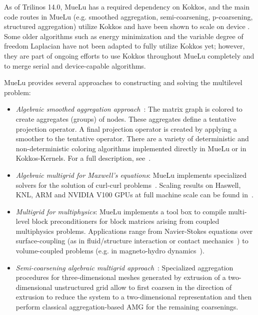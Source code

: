 As of Trilinos 14.0, MueLu has a required dependency on Kokkos,
and the main code routes in MueLu (e.g. smoothed aggregation, semi-coarsening, p-coarsening, structured aggregation)
utilize Kokkos and have been shown to scale on device .
Some older algorithms such as energy minimization and the variable degree of freedom Laplacian have not been adapted to fully utilize Kokkos yet;
however, they are part of ongoing efforts to use Kokkos throughout MueLu completely and to merge serial and device-capable algorithms.

MueLu provides several approaches to constructing and solving the multilevel problem:

\begin{itemize}
\item \emph{Algebraic smoothed aggregation approach}~\cite{Vanek1996a}:
The matrix graph is colored to create aggregates (groups) of nodes.
These aggregates define a tentative projection operator.
A final projection operator is created by applying a smoother to the tentative operator.
There are a variety of deterministic and non-deterministic coloring algorithms implemented directly
in MueLu or in Kokkos-Kernels.  For a full description, see~\cite{BergerVergiat2023a}.

\item \emph{Algebraic multigrid for Maxwell’s equations}:
  MueLu implements specialized solvers for the solution of curl-curl problems~\cite{BochevHuEtAl2008_AlgebraicMultigridApproachBased}.
  Scaling results on Haswell, KNL, ARM and NVIDIA V100 GPUs at full machine scale can be found in~\cite{BettencourtBrownEtAl2021_EmpirePic}.

\item \emph{Multigrid for multiphysics}:
MueLu implements a tool box to compile multi-level block preconditioners for block matrices arising from coupled multiphysics problems.
Applications range from Navier-Stokes equations
over surface-coupling (as in fluid/structure interaction or contact mechanics~\cite{Wiesner2021a})
to volume-coupled problems (e.g. in magneto-hydro dynamics~\cite{Ohm2022a}).

\item \emph{Semi-coarsening algebraic multigrid approach}~\cite{Tuminaro2016a}:
Specialized aggregation procedures for three-dimensional meshes generated by extrusion of a two-dimensional unstructured grid
allow to first coarsen in the direction of extrusion to reduce the system to a two-dimensional representation and then perform classical aggregation-based AMG
for the remaining coarsenings.


\end{itemize}
